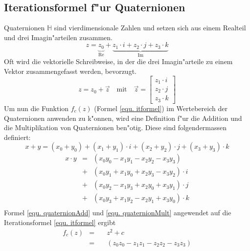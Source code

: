 \begin{refsection}
\subsection{Iterationsformel f"ur Quaternionen}
Quaternionen $\mathbb{H}$ sind vierdimensionale Zahlen und setzen sich
aus einem Realteil und drei Imagin"arteilen zusammen.
\begin{equation}
	z = \underbrace{z_0}_{\operatorname{Re}} + \underbrace{z_1\cdot i + z_2\cdot j + z_3\cdot k}_{\operatorname{Im}}
	\label{equ. quaternion}
\end{equation}
Oft wird die vektorielle Schreibweise, in der die drei Imagin"arteile
zu einem Vektor zusammengefasst werden, bevorzugt.
\begin{equation}
	z = z_0 + \vec z \quad \text{mit}\quad\vec z= \begin{bmatrix}z_1\cdot i\\ z_2\cdot j\\z_3\cdot k\end{bmatrix}
	\label{equ. quaternionVec}
\end{equation}
Um nun die Funktion $f_c(z)$ (Formel \ref{equ. itformel}) im Wertebereich
der Quaternionen anwenden zu k"onnen, wird eine Definition f"ur die
Addition und die Multiplikation von Quaternionen ben"otig. Diese sind
folgendermassen definiert: \cite{wikiQuaternionen}
\begin{equation}
	x + y = (x_0+y_0) + (x_1+y_1)\cdot i + (x_2+y_2)\cdot j + (x_3+y_3)\cdot k
	\label{equ. quaternionAdd}
\end{equation}
\begin{equation}
	\begin{array}{lcl}
	x\cdot y & = & (x_0y_0 - x_1y_1 - x_2y_2 - x_3y_3)\\
		 & + & (x_0y_1 + x_1y_0 + x_2y_3 - x_3y_2)\cdot i\\
		 & + & (x_0y_2 - x_1y_3 + x_2y_0 + x_3y_1)\cdot j\\
		 & + & (x_0y_3 + x_1y_2 - x_2y_1 + x_3y_0)\cdot k\\
	\end{array}
	\label{equ. quaternionMult}
\end{equation}
Formel \ref{equ. quaternionAdd} und \ref{equ. quaternionMult} angewendet
auf die Iterationsformel \ref{equ. itformel} ergibt
\begin{equation}
	\begin{array}{lcl}
	f_c(z) 	& = &\;\;\;\, z^2+c\\[0.3cm]
		& = &\;\;\;\, (z_0 z_0 - z_1 z_1 - z_2 z_2 - z_3 z_3)\\

\end{array}
\end{equation}
\end{refsection}
